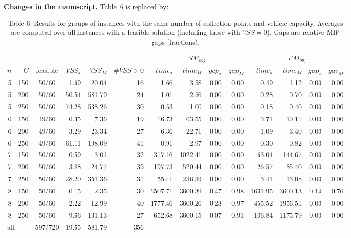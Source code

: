 \documentclass[11pt,a4paper]{article}
\begin{document}
\noindent\textbf{Changes in the manuscript.} Table~6 is replaced by:

\begin{table}[h]\centering\small\color{blue}
\setlength{\tabcolsep}{3.2pt}
\begin{tabular}{rrcrrr|rrrr|rrrr}
\toprule
 & & & & & & \multicolumn{4}{c|}{$SM_{obj}$} & \multicolumn{4}{c}{$EM_{obj}$}\\
$n$ & $C$ & feasible & $VSS_a$ & $VSS_M$ & $\#VSS{>}0$ & $time_a$ & $time_M$ & $gap_a$ & $gap_M$ & $time_a$ & $time_M$ & $gap_a$ & $gap_M$\\
\midrule
5 & 150 & 50/60 & 1.69  & 20.04  & 16 & 1.66    & 3.58    & 0.00 & 0.00 & 0.49    & 1.12    & 0.00 & 0.00\\
5 & 200 & 50/60 & 50.54 & 581.79 & 24 & 1.01    & 2.56    & 0.00 & 0.00 & 0.28    & 0.70    & 0.00 & 0.00\\
5 & 250 & 50/60 & 74.28 & 538.26 & 30 & 0.53    & 1.00    & 0.00 & 0.00 & 0.18    & 0.40    & 0.00 & 0.00\\
6 & 150 & 49/60 & 0.35  & 7.36   & 19 & 16.73   & 63.55   & 0.00 & 0.00 & 3.71    & 10.11   & 0.00 & 0.00\\
6 & 200 & 49/60 & 3.29  & 23.34  & 27 & 6.36    & 22.71   & 0.00 & 0.00 & 1.09    & 3.40    & 0.00 & 0.00\\
6 & 250 & 49/60 & 61.11 & 198.09 & 41 & 0.91    & 2.97    & 0.00 & 0.00 & 0.30    & 0.82    & 0.00 & 0.00\\
7 & 150 & 50/60 & 0.59  & 3.01   & 32 & 317.16  & 1022.41 & 0.00 & 0.00 & 63.04   & 144.67  & 0.00 & 0.00\\
7 & 200 & 50/60 & 3.88  & 24.77  & 39 & 197.73  & 520.44  & 0.00 & 0.00 & 26.57   & 85.40   & 0.00 & 0.00\\
7 & 250 & 50/60 & 28.20 & 351.36 & 31 & 55.41   & 236.39  & 0.00 & 0.00 & 3.41    & 13.08   & 0.00 & 0.00\\
8 & 150 & 50/60 & 0.15  & 2.35   & 30 & 2507.71 & 3600.39 & 0.47 & 0.98 & 1631.95 & 3600.13 & 0.14 & 0.76\\
8 & 200 & 50/60 & 2.22  & 12.99  & 40 & 1777.46 & 3600.26 & 0.23 & 0.97 & 455.52  & 1956.51 & 0.00 & 0.00\\
8 & 250 & 50/60 & 9.66  & 131.13 & 27 & 652.68  & 3600.15 & 0.07 & 0.91 & 106.84  & 1175.79 & 0.00 & 0.00\\
\midrule
\multicolumn{2}{l}{all} & 597/720 & 19.65 & 581.79 & 356 \\
\bottomrule
\end{tabular}
\caption*{\color{blue}Table 6: Results for groups of instances with the same number of collection points and vehicle capacity. Averages are computed over all instances with a feasible solution (including those with $VSS=0$). Gaps are relative MIP gaps (fractions).}
\end{table}
\end{document}
